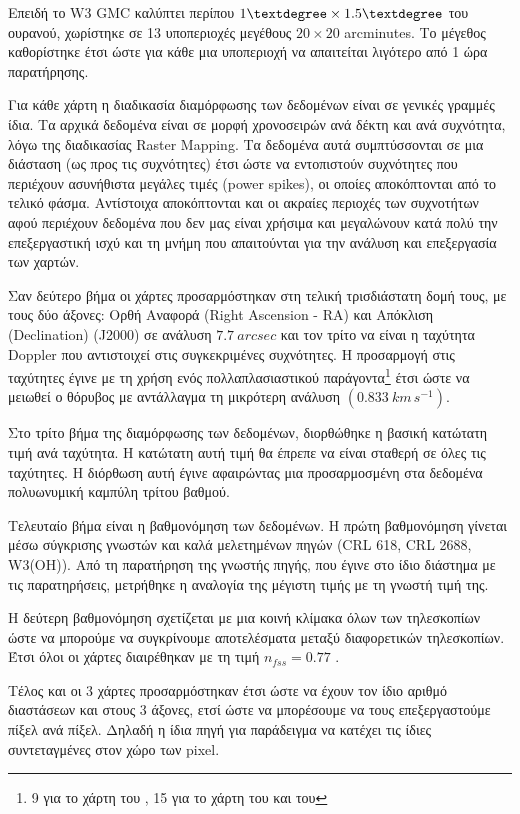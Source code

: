 \documentclass[a4paper,12pt]{memoir}
\begin{document}
Επειδή το W3 GMC καλύπτει περίπου $1 \textdegree \times 1.5 \textdegree$ του ουρανού, χωρίστηκε σε 13 υποπεριοχές μεγέθους $20 \times 20$ arcminutes. Το μέγεθος καθορίστηκε έτσι ώστε για κάθε μια υποπεριοχή να απαιτείται λιγότερο από 1 ώρα παρατήρησης. 

Για κάθε χάρτη η διαδικασία διαμόρφωσης των δεδομένων είναι σε γενικές γραμμές ίδια. Τα αρχικά δεδομένα είναι σε μορφή χρονοσειρών ανά δέκτη και ανά συχνότητα, λόγω της διαδικασίας Raster Mapping. Τα δεδομένα αυτά συμπτύσσονται σε μια διάσταση (ως προς τις συχνότητες) έτσι ώστε να εντοπιστούν συχνότητες που περιέχουν ασυνήθιστα μεγάλες τιμές (power spikes), οι οποίες αποκόπτονται από το τελικό φάσμα. Αντίστοιχα αποκόπτονται και οι ακραίες περιοχές των συχνοτήτων αφού περιέχουν δεδομένα που δεν μας είναι χρήσιμα και μεγαλώνουν κατά πολύ την επεξεργαστική ισχύ και τη μνήμη που απαιτούνται για την ανάλυση και επεξεργασία των χαρτών.

Σαν δεύτερο βήμα οι χάρτες προσαρμόστηκαν στη τελική τρισδιάστατη δομή τους, με τους δύο άξονες: Ορθή Αναφορά (Right Ascension - RA) και Απόκλιση (Declination) (J2000) σε ανάλυση $7.7\ arcsec$ και τον τρίτο να είναι η ταχύτητα Doppler που αντιστοιχεί στις συγκεκριμένες συχνότητες. Η προσαρμογή στις ταχύτητες έγινε με τη χρήση ενός πολλαπλασιαστικού παράγοντα\footnote{9 για το χάρτη του , 15 για το χάρτη του  και του } έτσι ώστε να μειωθεί ο θόρυβος με αντάλλαγμα τη μικρότερη ανάλυση $(0.833\ km\, s^{-1})$. 

Στο τρίτο βήμα της διαμόρφωσης των δεδομένων, διορθώθηκε η βασική κατώτατη τιμή ανά ταχύτητα. Η κατώτατη αυτή τιμή θα έπρεπε να είναι σταθερή σε όλες τις ταχύτητες. Η διόρθωση αυτή έγινε αφαιρώντας μια προσαρμοσμένη στα δεδομένα πολυωνυμική καμπύλη τρίτου βαθμού.

Τελευταίο βήμα είναι η βαθμονόμηση των δεδομένων. Η πρώτη βαθμονόμηση γίνεται μέσω σύγκρισης γνωστών και καλά μελετημένων πηγών (CRL 618, CRL 2688, W3(OH)). Από τη παρατήρηση της γνωστής πηγής, που έγινε στο ίδιο διάστημα με τις παρατηρήσεις, μετρήθηκε η αναλογία της μέγιστη τιμής με τη γνωστή τιμή της. 

Η δεύτερη βαθμονόμηση σχετίζεται με μια κοινή κλίμακα όλων των τηλεσκοπίων ώστε να μπορούμε να συγκρίνουμε αποτελέσματα μεταξύ διαφορετικών τηλεσκοπίων. Έτσι όλοι οι χάρτες διαιρέθηκαν με τη τιμή $n_{fss}=0.77$ \cite{buckle_:_2009}. 

Τέλος και οι 3 χάρτες προσαρμόστηκαν έτσι ώστε να έχουν τον ίδιο αριθμό διαστάσεων και στους 3 άξονες, ετσί ώστε να μπορέσουμε να τους επεξεργαστούμε πίξελ ανά πίξελ. Δηλαδή η ίδια πηγή για παράδειγμα να κατέχει τις ίδιες συντεταγμένες στον χώρο των pixel.
\end{document}

